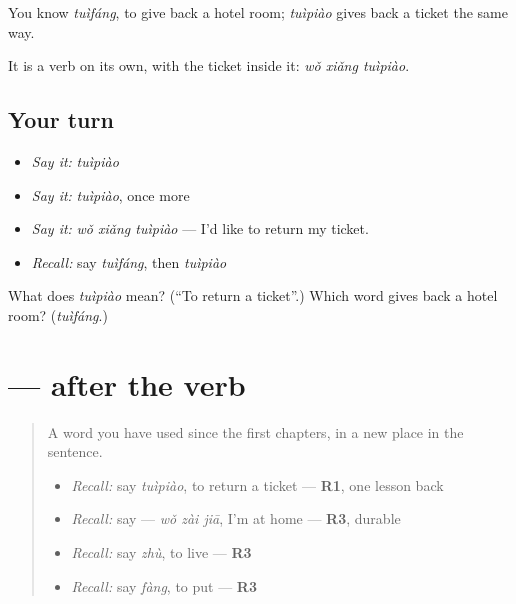 \begin{grammarlens}[title={What you've built}]
You know \emph{tuìfáng}, to give back a hotel room; \emph{tuìpiào} gives back a ticket the same way.

It is a verb on its own, with the ticket inside it: \emph{wǒ xiǎng tuìpiào}.
\end{grammarlens}

\subsection*{Your turn}
\begin{itemize}
\raggedright
  \item \emph{Say it:} \emph{tuìpiào}
  \item \emph{Say it:} \emph{tuìpiào}, once more
  \item \emph{Say it:} \emph{wǒ xiǎng tuìpiào} — I'd like to return my ticket.
  \item \emph{Recall:} say \emph{tuìfáng}, then \emph{tuìpiào}
\end{itemize}

\begin{tcolorbox}[breakable,colback=teal!4,colframe=teal!35!black,title={Before you move on}]
What does \emph{tuìpiào} mean? (\textquotedblleft{}To return a ticket\textquotedblright{}.) Which word gives back a hotel room? (\emph{tuìfáng}.)
\end{tcolorbox}
\section[\texorpdfstring{\zh{坐在这儿} (zuò zài zhèr)}{坐在这儿 (zuò zài zhèr)}]{ —  after the verb}

\label{lesson:ZH-C284-v-zai}



\begin{quote}
A word you have used since the first chapters, in a new place in the sentence.

\begin{itemize}
\raggedright
  \item \emph{Recall:} say \emph{tuìpiào}, to return a ticket — \textbf{R1}, one lesson back
  \item \emph{Recall:} say  — \emph{wǒ zài jiā}, I'm at home — \textbf{R3}, durable
  \item \emph{Recall:} say \emph{zhù}, to live — \textbf{R3}
  \item \emph{Recall:} say \emph{fàng}, to put — \textbf{R3}
\end{itemize}
\end{quote}

